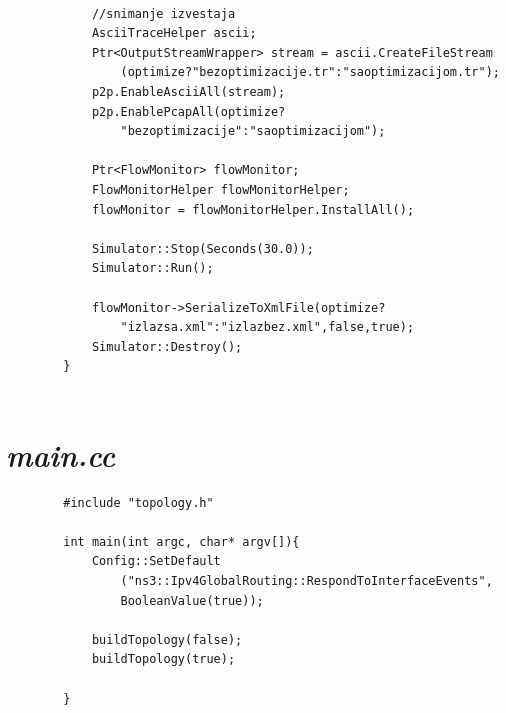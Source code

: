 \documentclass[a4paper, 12pt, projekat]{etf}
\begin{document}
\begin{verbatim}
			
			//snimanje izvestaja
			AsciiTraceHelper ascii;
			Ptr<OutputStreamWrapper> stream = ascii.CreateFileStream
			    (optimize?"bezoptimizacije.tr":"saoptimizacijom.tr");
			p2p.EnableAsciiAll(stream);
			p2p.EnablePcapAll(optimize?
			    "bezoptimizacije":"saoptimizacijom");
			
			Ptr<FlowMonitor> flowMonitor;
			FlowMonitorHelper flowMonitorHelper;
			flowMonitor = flowMonitorHelper.InstallAll();
			
			Simulator::Stop(Seconds(30.0));
			Simulator::Run();
			
			flowMonitor->SerializeToXmlFile(optimize?
			    "izlazsa.xml":"izlazbez.xml",false,true);
			Simulator::Destroy();
		}
	
	\end{verbatim}
	\section*{\emph{main.cc}}
	\begin{verbatim}
		#include "topology.h"
		
		int main(int argc, char* argv[]){
			Config::SetDefault 
			    ("ns3::Ipv4GlobalRouting::RespondToInterfaceEvents", 
			    BooleanValue(true));
			
			buildTopology(false);
			buildTopology(true);
			
		}
	\end{verbatim}
\end{document}
